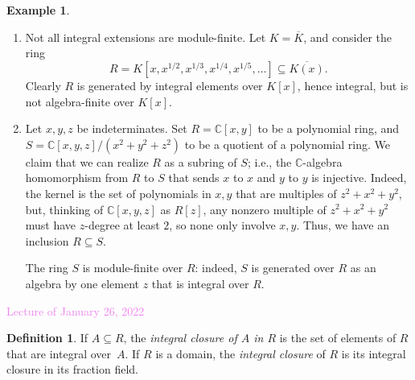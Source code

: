 \documentclass{amsart}[12pt]
\newcommand{\Jan}[1]{\textcolor{violet}{Lecture of January #1, 2022}}
\newcommand{\C}{\mathbb{C}}
\numberwithin{equation}{section}
\theoremstyle{plain} %
\theoremstyle{definition}
\newtheorem{definition}[equation]{Definition}
\newtheorem{ex}[equation]{Example}
\theoremstyle{remark}
\begin{document}
\begin{ex}
	\begin{enumerate}
			\item Not all integral extensions are module-finite. Let $K=\overline{K}$, and consider the ring \[R=K[x,x^{1/2},x^{1/3},x^{1/4},x^{1/5},\dots]\subseteq \overline{K(x)}.\] Clearly $R$ is generated by integral elements over $K[x]$, hence integral, but is not algebra-finite over $K[x]$.

		\item Let $x,y,z$ be indeterminates. Set $R=\C[x,y]$ to be a polynomial ring, and $S=\C[x,y,z]/(x^2+y^2+z^2)$ to be a quotient of a polynomial ring. We claim that we can realize $R$ as a subring of $S$; i.e., the $\C$-algebra homomorphism from $R$ to $S$ that sends $x$ to $x$ and $y$ to $y$ is injective. Indeed, the kernel is the set of polynomials in $x,y$ that are multiples of $z^2+x^2+y^2$, but, thinking of $\C[x,y,z]$ as $R[z]$, any nonzero multiple of $z^2+x^2+y^2$ must have $z$-degree at least $2$, so none only involve $x,y$. Thus, we have an inclusion $R\subseteq S$.	
				
		The ring $S$ is module-finite over $R$: indeed, $S$ is generated over $R$ as an algebra by one element $z$ that is integral over $R$.

%		
	\end{enumerate}
\end{ex}



\Jan{26}


\begin{definition}
	If $A\subseteq R$, the \emph{integral closure of $A$ in $R$} is the set of elements of $R$ that are integral over~$A$. If $R$ is a domain, the \emph{integral closure} of $R$ is its integral closure in its fraction field.
\end{definition}
\end{document}
